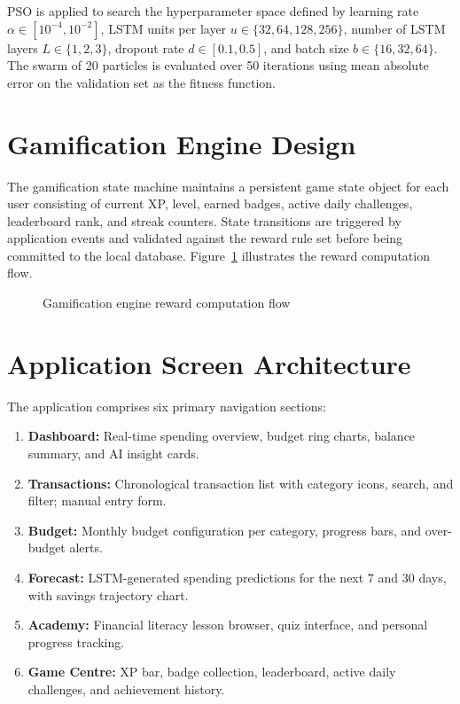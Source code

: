 \documentclass[12pt,a4paper]{report}
\begin{document}
PSO is applied to search the hyperparameter space defined by learning rate
$\alpha \in [10^{-4}, 10^{-2}]$, LSTM units per layer $u \in \{32, 64, 128, 256\}$,
number of LSTM layers $L \in \{1, 2, 3\}$, dropout rate $d \in [0.1, 0.5]$, and
batch size $b \in \{16, 32, 64\}$. The swarm of 20 particles is evaluated over 50
iterations using mean absolute error on the validation set as the fitness function.

\section{Gamification Engine Design}

The gamification state machine maintains a persistent game state object for each user
consisting of current XP, level, earned badges, active daily challenges, leaderboard
rank, and streak counters. State transitions are triggered by application events and
validated against the reward rule set before being committed to the local database.
Figure~\ref{fig:gamification_flow} illustrates the reward computation flow.

\begin{figure}[H]
\centering
\caption{Gamification engine reward computation flow}
\label{fig:gamification_flow}
\end{figure}

\section{Application Screen Architecture}

The application comprises six primary navigation sections:

\begin{enumerate}
    \item \textbf{Dashboard:} Real-time spending overview, budget ring charts, balance summary, and AI insight cards.
    \item \textbf{Transactions:} Chronological transaction list with category icons, search, and filter; manual entry form.
    \item \textbf{Budget:} Monthly budget configuration per category, progress bars, and over-budget alerts.
    \item \textbf{Forecast:} LSTM-generated spending predictions for the next 7 and 30 days, with savings trajectory chart.
    \item \textbf{Academy:} Financial literacy lesson browser, quiz interface, and personal progress tracking.
    \item \textbf{Game Centre:} XP bar, badge collection, leaderboard, active daily challenges, and achievement history.
\end{enumerate}
\end{document}
